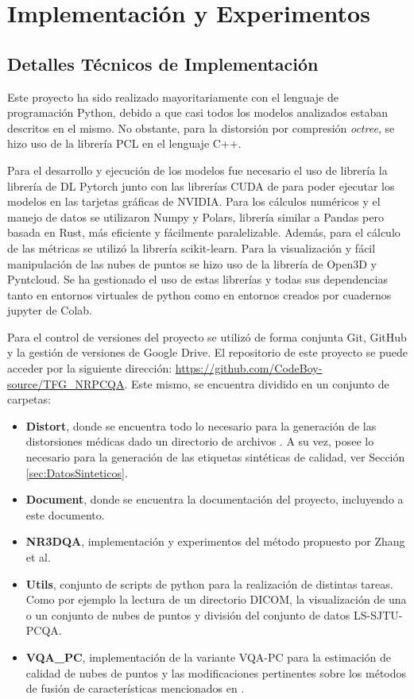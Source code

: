 \chapter{Implementación y Experimentos} 
\label{sec:Implementacion}
\section{Detalles Técnicos de Implementación} 
Este proyecto ha sido realizado mayoritariamente con el lenguaje de programación Python, 
debido a que casi todos los modelos analizados estaban descritos en el mismo.
No obstante, para la distorsión por compresión \emph{octree}\cite{OctreeCompression}, 
se hizo uso de la librería PCL\cite{PCL} en el lenguaje C++.

Para el desarrollo y ejecución de los modelos fue necesario el uso de librería 
la librería de DL Pytorch junto con las librerías CUDA de para poder ejecutar 
los modelos en las tarjetas gráficas de NVIDIA. Para los cálculos numéricos y 
el manejo de datos se utilizaron Numpy y Polars, librería similar a Pandas 
pero basada en Rust, más eficiente y fácilmente paralelizable. Además, para el
cálculo de las métricas se utilizó la librería scikit-learn.
Para la visualización y fácil manipulación de las nubes de puntos se hizo uso 
de la librería de Open3D\cite{Open3D} y Pyntcloud.
Se ha gestionado el uso de estas librerías y todas sus dependencias tanto en entornos virtuales 
de python como en entornos creados por cuadernos jupyter de Colab.

Para el control de versiones del proyecto se utilizó de forma conjunta Git, GitHub
y la gestión de versiones de Google Drive. El repositorio de este proyecto se 
puede acceder por la siguiente dirección: \url{https://github.com/CodeBoy-source/TFG_NRPCQA}.
Este mismo, se encuentra dividido en un conjunto de carpetas: 
\begin{itemize}
  \item \textbf{Distort}, donde se encuentra todo lo necesario para la generación 
    de las distorsiones médicas dado un directorio de archivos . 
    A su vez, posee lo necesario para la generación de las etiquetas sintéticas 
    de calidad, ver Sección \ref{sec:DatosSinteticos}.
  \item \textbf{Document}, donde se encuentra la documentación del proyecto, 
    incluyendo a este documento. 
  \item \textbf{NR3DQA}, implementación y experimentos del método propuesto 
    por Zhang et al\cite{NR3DQA}.
  \item \textbf{Utils}, conjunto de scripts de python para la realización de distintas 
    tareas. Como por ejemplo la lectura de un directorio DICOM, la visualización 
    de una o un conjunto de nubes de puntos y división del conjunto de datos LS-SJTU-PCQA\cite{ResSCNN}.
  \item \textbf{VQA\_PC}, implementación de la variante VQA-PC\cite{VQA-PC} para 
    la estimación de calidad de nubes de puntos y las modificaciones pertinentes 
    sobre los métodos de fusión de características mencionados en \cite{EnsemblePCQA}. 
\end{itemize}
